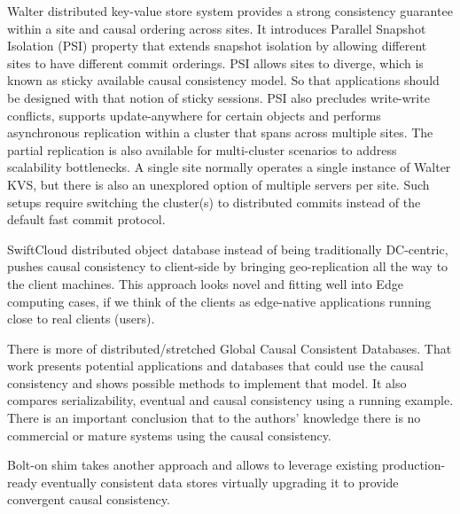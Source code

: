 \documentclass[conference]{IEEEtran}
\begin{document}
Walter distributed key-value store system\cite{b11} provides a strong
consistency guarantee within a site and causal ordering across sites. It
introduces Parallel Snapshot Isolation (PSI) property that extends snapshot
isolation by allowing different sites to have different commit orderings. PSI
allows sites to diverge, which is known as sticky available causal consistency
model. So that applications should be designed with that notion of sticky
sessions. PSI also precludes write-write conflicts, supports update-anywhere
for certain objects and performs asynchronous replication within a cluster that
spans across multiple sites. The partial replication is also available for
multi-cluster scenarios to address scalability bottlenecks. A single site
normally operates a single instance of Walter KVS, but there is also an
unexplored option of multiple servers per site. Such setups require switching
the cluster(s) to distributed commits instead of the default fast commit
protocol.

SwiftCloud distributed object database\cite{b12} instead of being traditionally
DC-centric, pushes causal consistency to client-side by bringing
geo-replication all the way to the client machines. This approach looks novel
and fitting well into Edge computing cases, if we think of the clients as
edge-native applications running close to real clients (users).

There is more of distributed/stretched Global Causal Consistent
Databases\cite{b6}. That work presents potential applications and databases
that could use the causal consistency and shows possible methods to implement
that model. It also compares serializability, eventual and causal consistency
using a running example. There is an important conclusion that to the authors’
knowledge there is no commercial or mature systems using the causal
consistency.

Bolt-on\cite{b13} shim takes another approach and allows to leverage existing
production-ready eventually consistent data stores virtually upgrading it to
provide convergent causal consistency.
\end{document}
